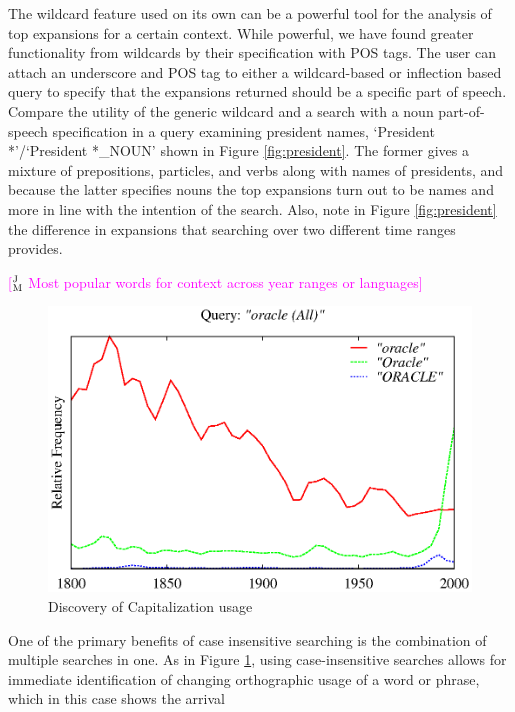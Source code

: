 \documentclass[11pt]{article}
\newcommand{\jmcomment}[1]{\textcolor{magenta}{[$^{\textsc{J}}_{\textsc{M}}$ #1]}}
\begin{document}
The wildcard feature used on its own can be a powerful tool for the analysis of top expansions for a certain context. While powerful, we have found greater functionality from wildcards by their specification with POS tags. The user can attach an underscore and POS tag to either a wildcard-based or inflection based query to specify that the expansions returned should be a specific part of speech. Compare the utility of the generic wildcard and a search with a noun part-of-speech specification in a query examining president names, `President *'/`President *\textsf{\textsc{\_NOUN}}' shown in Figure \ref{fig:president}. The former gives a mixture of prepositions, particles, and verbs along with names of presidents, and because the latter specifies nouns the top expansions turn out to be names and more in line with the intention of the search. Also, note in Figure \ref{fig:president} the difference in expansions that searching over two different time ranges provides.




\jmcomment{Most popular words for context across year ranges or languages}
\begin{figure}
\centering
\includegraphics[width=.48\textwidth]{graphs/oracle}
\caption{\label{fig:apple} Discovery of Capitalization usage}
\end{figure}

One of the primary benefits of case insensitive searching is the combination of multiple searches in one. As in Figure \ref{fig:apple}, using case-insensitive searches allows for immediate identification of changing orthographic usage of a word or phrase, which in this case shows the arrival
\end{document}
